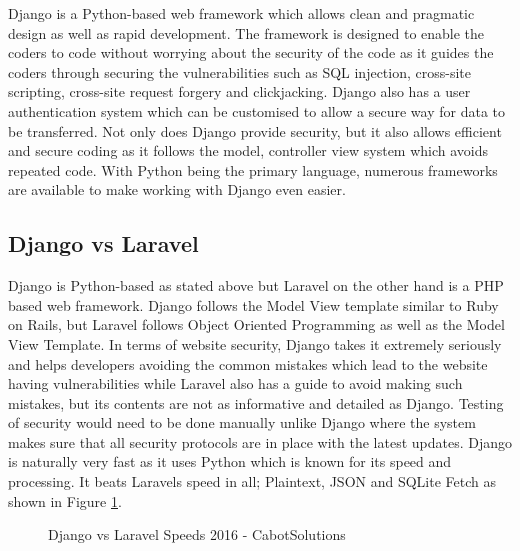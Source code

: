 \documentclass[../main.tex]{subfiles}
\begin{document}
\raggedright
Django is a Python-based web framework which allows clean and pragmatic design as well as rapid development. The framework is designed to enable the coders to code without worrying about the security of the code as it guides the coders through securing the vulnerabilities such as SQL injection, cross-site scripting, cross-site request forgery and clickjacking. Django also has a user authentication system which can be customised to allow a secure way for data to be transferred\cite{django}. Not only does Django provide security, but it also allows efficient and secure coding as it follows the model, controller view system which avoids repeated code. With Python being the primary language, numerous frameworks are available to make working with Django even easier.\cite{whyusedjango} 

\subsection{Django vs Laravel}
Django is Python-based as stated above but Laravel\cite{laravel} on the other hand is a PHP based web framework. Django follows the Model View template similar to Ruby on Rails, but Laravel follows Object Oriented Programming as well as the Model View Template. In terms of website security, Django takes it extremely seriously and helps developers avoiding the common mistakes which lead to the website having vulnerabilities while Laravel also has a guide to avoid making such mistakes, but its contents are not as informative and detailed as Django. Testing of security would need to be done manually unlike Django where the system makes sure that all security protocols are in place with the latest updates.
Django is naturally very fast as it uses Python which is known for its speed and processing. It beats Laravels speed in all; Plaintext, JSON and SQLite Fetch\cite{djangovslaravel} as shown in Figure \ref{fig:djangovslaravelsp}.

\begin{figure}[H]
        \caption{\label{fig:djangovslaravelsp} Django vs Laravel Speeds 2016 - CabotSolutions\cite{djangovslaravel}}
      \end{figure}
      
\end{document}
